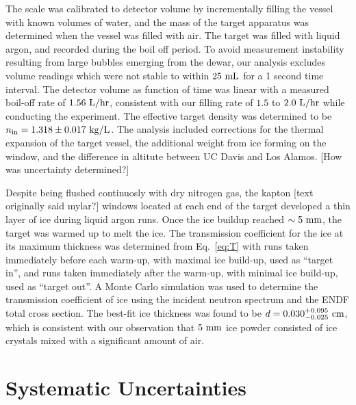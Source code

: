 \documentclass[%
 reprint,
superscriptaddress,
 preprintnumbers,
 nofootinbib,
 nobibnotes,
 bibnotes,
 amsmath,amssymb,
 aps,
 prl, 
 floatfix,
]{revtex4-1}
\begin{document}
The scale was calibrated to detector volume by incrementally filling
the vessel with known volumes of water, and the mass of the target
apparatus was determined when the vessel was filled with air.  The
target was filled with liquid argon, and recorded during the boil off
period.  To avoid measurement instability resulting from large bubbles
emerging from the dewar, our analysis excludes volume readings which
were not stable to within $25~\rm mL$ for a 1 second time interval.
The detector volume as function of time was linear with a measured
boil-off rate of $1.56~\rm L/hr$, consistent with our filling rate of
$1.5$ to $2.0~\rm L/hr$ while conducting the experiment.  The
effective target density was determined to be $n_{\rm in} = 1.318 \pm
0.017~{\rm kg/L}$.  The analysis included corrections for the thermal
expansion of the target vessel, the additional weight from ice forming
on the window, and the difference in altitute between UC Davis and Los
Alamos.
{\color{red} [How was uncertainty determined?]}

Despite being flushed continuosly with dry nitrogen gas, the kapton
{\color{red} [text originally said mylar?]} windows located at each
end of the target developed a thin layer of ice during liquid argon
runs.  Once the ice buildup reached $\sim 5~\rm mm$, the target was
warmed up to melt the ice.  The transmission coefficient for the ice
at its maximum thickness was determined from Eq.~\ref{eq:T} with runs
taken immediately before each warm-up, with maximal ice build-up, used
as ``target in'', and runs taken immediately after the warm-up, with
minimal ice build-up, used as ``target out''.  A Monte Carlo
simulation was used to determine the transmission coefficient of ice
using the incident neutron spectrum and the ENDF total cross section.
The best-fit ice thickness was found to be $d =
0.030^{+0.095}_{-0.025}~\rm cm$, which is consistent with our
observation that $5~\rm mm$ ice powder consisted of ice crystals mixed
with a significant amount of air.

\section{\label{sec:energy}Systematic Uncertainties}
\end{document}

